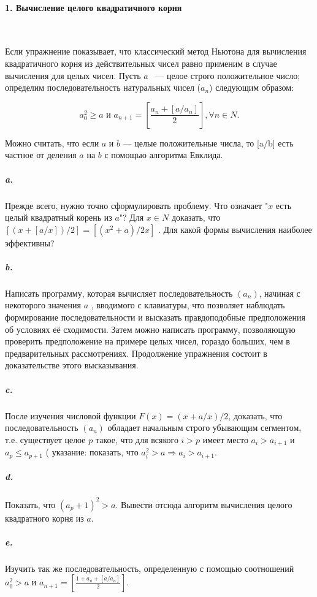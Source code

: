 \documentclass{mai_book}
\begin{document}
\paragraph { 1. Вычисление целого квадратичного корня}\ \newline

Если упражнение показывает, что классический метод Ньютона для вычисления квадратичного корня из действительных чисел равно применим в случае вычисления для целых чисел. Пусть $a$ ~--- целое строго положительное число; определим последовательность натуральных чисел ($a_{n}$) следующим образом: 

\begin{equation*}
a_0^2 \geqslant {a}  \text{    и     }  a_{n+1} = \left[\frac{a_n+\left[a/a_n\right]}{2}\right], \forall{n} \in {N}.
\end{equation*}

Можно считать, что если $a$ и $b$ --- целые положительные  числа, то [a/b] есть частное от деления $a$ на $b$ с помощью алгоритма Евклида. 

\subparagraph { a.}  Прежде всего, нужно точно сформулировать проблему. Что означает "$x$ есть целый квадратный корень из $a$"?
Для $x \in{N}$ доказать, что $\left[\left(x+\left[a/x\right]\right)/2\right]=\left[\left(x^{2}+a\right)/2x\right]$ . Для какой формы вычисления наиболее эффективны? 

\subparagraph {b.} Написать программу, которая вычисляет последовательность $(a_{n})$, начиная с некоторого значения $a$ , вводимого с клавиатуры, что позволяет наблюдать формирование последовательности и высказать правдоподобные предположения об условиях её сходимости. Затем можно написать программу, позволяющую проверить предположение на примере целых чисел, гораздо больших, чем в предварительных рассмотрениях. Продолжение упражнения состоит в доказательстве этого высказывания.

\subparagraph { c.} После изучения числовой функции $F\left(x\right)=\left(x+a/x\right)/2$, доказать, что последовательность $\left(a_{n}\right)$ обладает начальным строго убывающим сегментом, т.е. существует  целое $p$ такое, что для всякого $i>p$ имеет место $a_{i}>a_{i+1}$ и $a_{p}\leq{a_{p+1}}$ ( указание: показать, что $a_i^2>a\Rightarrow{a_{i}>a_{i+1}}$.

\subparagraph {d.} Показать, что  $\left(a_p+1\right)^2>a$. Вывести отсюда алгоритм вычисления целого квадратного корня из $a$. 

\subparagraph {e.} Изучить так же последовательность, определенную с помощью соотношений $a_0^2>a$  и 
$ a_{n+1} = \left[\frac{1+a_{n}+\left[a/a_{n}\right]}{2}\right]$.
\end{document}
